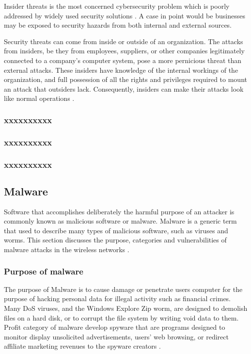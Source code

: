 \documentclass[twocolumn]{article}
\begin{document}
Insider threats is the most concerned cybersecurity
problem which is poorly addressed by widely used security
solutions    \cite{singh2022systematic}. A case in point would be businesses may be exposed   to security hazards from both internal and external sources.

Security threats can come from inside or outside of an organization. The attacks from insiders, be they from employees, suppliers, or other companies legitimately connected to a company’s computer system, pose a more pernicious threat than external attacks. These insiders have knowledge of the internal workings of the organization, and full
possession of all the rights and privileges required to mount an attack that outsiders lack. Consequently, insiders can make their attacks look like normal operations \cite{gheyas2016detection}.  




\subsubsection{xxxxxxxxxx}
\subsubsection{xxxxxxxxxx}
\subsubsection{xxxxxxxxxx}
\subsection{Malware}
Software that accomplishes deliberately the harmful purpose of an attacker is commonly known as malicious software or malware. Malware is a generic term that
used to describe many types of malicious software, such as viruses and worms.
This section discusses the purpose, categories and vulnerabilities of malware attacks in the wireless networks \cite{divya2013survey}.
\subsubsection{Purpose of malware}
The purpose of Malware is to cause damage or penetrate users computer for the purpose of hacking personal data for illegal activity such as financial crimes. Many DoS viruses, and the
Windows Explore Zip worm, are designed to demolish files on a hard disk, or to corrupt the file system by writing void data to them. Profit category of malware develop spyware that are programs designed to monitor display unsolicited advertisements, users' web browsing, or
redirect affiliate marketing revenues to the spyware creators  \cite{divya2013survey}.
\end{document}
